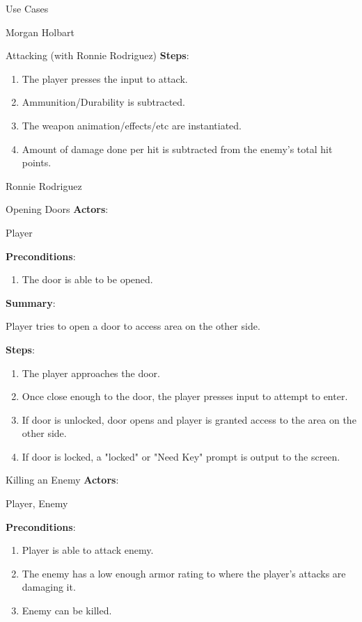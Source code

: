 \documentclass[12pt]{report}
\begin{document}
\begin{section}{Use Cases}
\begin{subsection}{Morgan Holbart}
\begin{subsubsection}{Attacking (with Ronnie Rodriguez)}
\textbf{Steps}:

\begin{enumerate}
\item The player presses the input to attack.
\item Ammunition/Durability is subtracted.
\item The weapon animation/effects/etc are instantiated.
\item Amount of damage done per hit is subtracted from the enemy's total hit
points.
\end{enumerate}
\end{subsubsection}
\end{subsection}

\begin{subsection}{Ronnie Rodriguez}
\begin{subsubsection}{Opening Doors}
\textbf{Actors}:

Player

\textbf{Preconditions}:

\begin{enumerate}
\item The door is able to be opened.
\end{enumerate}

\textbf{Summary}:

Player tries to open a door to access area on the other side. 

\textbf{Steps}:

\begin{enumerate}
\item The player approaches the door.
\item Once close enough to the door, the player presses input to attempt to
enter.
\item If door is unlocked, door opens and player is granted access to the
area on the other side.
\item If door is locked, a "locked" or "Need Key" prompt is output to the
screen.
\end{enumerate}
\end{subsubsection}

\begin{subsubsection}{Killing an Enemy}
\textbf{Actors}:

Player, Enemy

\textbf{Preconditions}:

\begin{enumerate}
\item Player is able to attack enemy.
\item The enemy has a low enough armor rating to where the player's attacks
are damaging it.
\item Enemy can be killed.
\end{enumerate}


\end{subsubsection}
\end{subsection}
\end{section}
\end{document}
